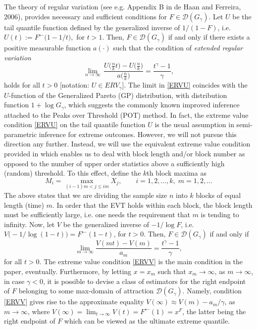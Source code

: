 \documentclass[10pt, a4paper, oneside]{article}
\newcommand{\mc}[1]{{\ensuremath{\mathcal{#1}}}}
\newcommand{\limit}[1]{\ensuremath{\displaystyle {\lim_{#1 \rightarrow{\infty}}}}}
\begin{document}
The theory of regular variation (see e.g. Appendix B in de Haan and Ferreira, 2006), provides necessary and sufficient conditions for $F\in \mc{D}(G_{\gamma})$. Let $U$ be the tail quantile function defined by the generalized inverse of $1/(1-F)$, i.e.
$
U(t):=   F^{\leftarrow} \bigl( 1-1/t\bigr),$ for $t>1$.
Then, $F\in \mc{D}(G_{\gamma})$ if and only if there exists a positive  measurable function $a(\cdot)$ such that the condition of \emph{extended regular variation}
\begin{equation}\label{ERVU}
	\limit{n}\,\frac{U\bigl(\frac{n}{k}t\bigr)-U\bigl(\frac{n}{k}\bigr)}{a\bigl(\frac{n}{k}\bigr)}= \frac{t^{\gamma}-1}{\gamma},
\end{equation}
holds for all $t>0$ [notation: $U\in ERV_{\gamma}$].
The limit  in  \eqref{ERVU} coincides with the $U$-function of the Generalized Pareto (GP) distribution, with distribution function $1+\log G_\gamma$, which suggests the commonly known improved inference attached to the Peaks over Threshold (POT) method. In fact, the extreme value condition \eqref{ERVU}  on the tail quantile function $U$ is the usual assumption in semi-parametric inference for extreme outcomes. However, we will not pursue this direction any further. Instead, we will use the equivalent extreme value condition provided in \citet{FdeH:15} which enables us to deal with block length and/or block number as opposed to the number of upper order statistics above a sufficiently high (random) threshold. To this effect, define the $k$th block maxima as
\begin{equation}\label{BM}
		M_i = \max_{(i-1)m < j \leq im} X_j, \qquad i=1,2,\ldots, k, \; m=1,2,\ldots
\end{equation}
The above states that we are dividing the sample size $n$ into $k$ blocks of equal length (time) $m$. In order that the EVT holds within each block, the block length must be sufficiently large, i.e. one needs the requirement that $m$ is tending to infinity. Now, let $V$ be the generalized inverse of $-1/\log F$, i.e. $V\bigl(-1/\log(1-t)\bigr)= F^{\leftarrow}(1-t)$, for $t>0$. Then, $F\in \mc{D}(G_{\gamma})$ if and only if
\begin{equation}\label{ERVV}
	\limit{m} \frac{V(mt)-V(m)}{a_m}= \frac{t^{\gamma}-1}{\gamma},
\end{equation}
for all $t>0$. The extreme value condition \eqref{ERVV} is the main condition in the paper, eventually. Furthermore, by letting $x=x_m$ such that $x_m \rightarrow \infty$, as $m \rightarrow \infty$, in case $\gamma<0$, it is possible to devise a class of estimators for the right endpoint of $F$ belonging to some max-domain of attraction $\mc{D}(G_{\gamma})$. Namely, condition \eqref{ERVV} gives rise to the approximate equality $V(\infty) \approx V(m) - a_m/\gamma$, as $m\rightarrow \infty$,
where $V(\infty) = \lim_{t \rightarrow \infty} V(t) = F^{\leftarrow}(1) = x^F$, the latter being the right endpoint of $F$ which can be viewed as the ultimate extreme quantile.
\end{document}
